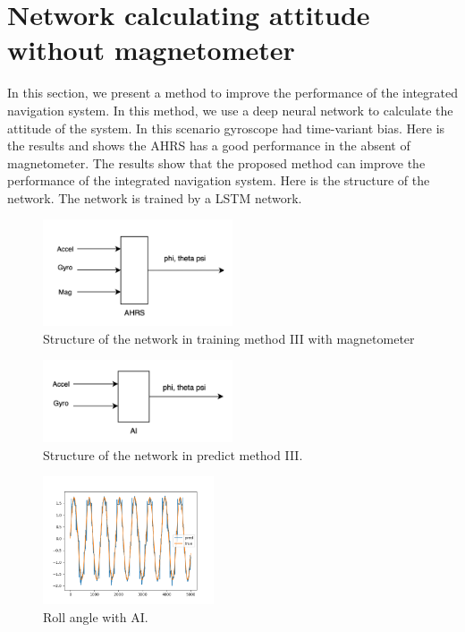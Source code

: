 \documentclass[conference]{IEEEtran}
\begin{document}
    \section{Network calculating attitude without magnetometer}
    In this section, we present a method to improve the performance of the integrated navigation system. In this method, we use a deep neural network to calculate the attitude of the system. In this scenario gyroscope had time-variant bias. Here is the results and shows the AHRS has a good performance in the absent of magnetometer. The results show that the proposed method can improve the performance of the integrated navigation system. Here is the structure of the network. The network is trained by a LSTM network.
    \begin{figure}[H]
        \centerline{\includegraphics[width=0.5\textwidth]{../Figures/part_3_network_train.png}}
        \caption{Structure of the network in training method III with magnetometer}
    \end{figure}
    \begin{figure}[H]
        \centerline{\includegraphics[width=0.5\textwidth]{../Figures/part_3_network_predict.png}}
        \caption{Structure of the network in predict method III.}
    \end{figure}
    \begin{figure}[H]
        \centerline{\includegraphics[width=0.45\textwidth]{../Figures/part_3_phi.png}}
        \caption{Roll angle with AI.}
    \end{figure}
\end{document}
